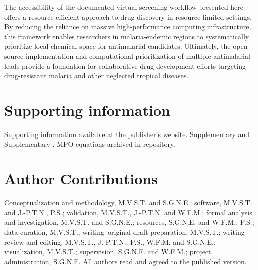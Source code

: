 \documentclass[journal=jcisd8,manuscript=article]{achemso}
\begin{document}
The accessibility of the documented virtual-screening workflow presented here offers a resource-efficient approach to drug discovery in resource-limited settings.
By reducing the reliance on massive high-performance computing infrastructure, this framework enables researchers in malaria-endemic regions to systematically
prioritize local chemical space for antimalarial candidates. Ultimately, the open-source implementation and computational prioritization of multiple
antimalarial leads provide a foundation for collaborative drug development efforts targeting drug-resistant malaria and other neglected tropical diseases.


\section*{Supporting information}
Supporting information available at the publisher's website. Supplementary  and Supplementary . MPO equations
archived in repository.

\section*{Author Contributions}
Conceptualization and methodology, M.V.S.T. and S.G.N.E.; software, M.V.S.T. and J.-P.T.N., P.S.; validation, M.V.S.T., J.-P.T.N. and W.F.M.; formal analysis
and investigation, M.V.S.T. and S.G.N.E.; resources, S.G.N.E. and W.F.M., P.S.; data curation, M.V.S.T.; writing--original draft preparation, M.V.S.T.;
writing--review and editing, M.V.S.T., J.-P.T.N., P.S., W.F.M. and S.G.N.E.; visualization, M.V.S.T.; supervision, S.G.N.E. and W.F.M.; project administration,
S.G.N.E. All authors read and agreed to the published version.
\end{document}
